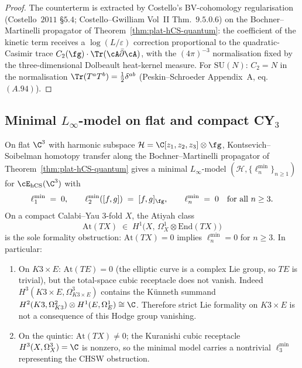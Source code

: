\begin{proof}
The counterterm is extracted by Costello's BV-cohomology regularisation
(Costello~$2011$ \S$5.4$; Costello--Gwilliam Vol~II Thm.~$9.5.0.6$) on
the Bochner--Martinelli propagator of
Theorem~\ref{thm:plat-hCS-quantum}:
the coefficient of the kinetic term receives a
$\log(L/\varepsilon)$ correction proportional to the
quadratic-Casimir trace
$C_2(\fg)\cdot \Tr(\cA \bar\partial \cA)$, with the $(4\pi)^{-3}$
normalisation fixed by the three-dimensional Dolbeault heat-kernel
measure. For $\mathrm{SU}(N)$: $C_2 = N$ in the normalisation
$\Tr(T^a T^b) = \tfrac{1}{2}\delta^{ab}$ (Peskin--Schroeder Appendix~A,
eq.~$(A.94)$).
\end{proof}

\subsection{Minimal \texorpdfstring{$L_\infty$}{L-inf}-model on flat and compact CY\texorpdfstring{$_3$}{-3}}
\label{subsec:hcs-minimal-model}

\begin{theorem}
\label{thm:plat-Linf-minimal}
On flat $\C^3$ with harmonic subspace $\mathcal{H} = \C[z_1, z_2, z_3]
\otimes \fg$, Kontsevich--Soibelman homotopy transfer along the
Bochner--Martinelli propagator of
Theorem~\ref{thm:plat-hCS-quantum} gives a minimal $L_\infty$-model
$(\mathcal{H}, \{\ell_n^{\min}\}_{n \geq 1})$ for
$\cE_{\hCS}(\C^3)$ with
\[
 \ell_1^{\min} \;=\; 0,
 \qquad
 \ell_2^{\min}([f, g]) \;=\; [f, g]_\fg,
 \qquad
 \ell_n^{\min} \;=\; 0 \quad \text{for all } n \geq 3.
\]
On a compact Calabi--Yau $3$-fold $X$, the Atiyah class
\[
 \mathrm{At}(TX) \;\in\;
 H^1\!\bigl(X,\,\Omega^1_X \otimes \mathrm{End}(TX)\bigr)
\]
is the sole formality obstruction: $\mathrm{At}(TX) = 0$ implies
$\ell_n^{\min} = 0$ for $n \geq 3$. In particular:
\begin{enumerate}[label=\textup{(\roman*)}]
\item On $K3 \times E$: $\mathrm{At}(TE) = 0$ (the elliptic curve is a
complex Lie group, so $TE$ is trivial), but the total-space cubic
receptacle does not vanish. Indeed
$H^3(K3\times E,\Omega^3_{K3\times E})$ contains the K\"unneth summand
$H^2(K3,\Omega^2_{K3})\otimes H^1(E,\Omega^1_E)\cong\C$.
Therefore strict Lie formality on $K3\times E$ is not a consequence of
this Hodge group vanishing.
\item On the quintic: $\mathrm{At}(TX) \neq 0$; the Kuranishi cubic
receptacle $H^3(X, \Omega^3_X) = \C$ is nonzero, so the minimal model
carries a nontrivial $\ell_3^{\min}$ representing the CHSW obstruction.
\end{enumerate}
\end{theorem}

